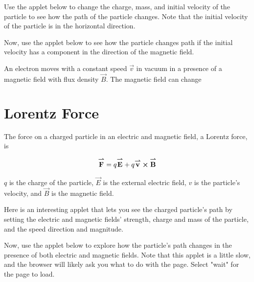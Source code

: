 \documentclass{ximera}
\begin{document}
\begin{example}

 Use the applet below to change the charge, mass, and initial velocity of the particle to see how the path of the particle changes. Note that the initial velocity of the particle is in the horizontal direction.


\end{example}


\begin{example}
Now, use the applet below to see how the particle changes path if the initial velocity has a component in the direction of the magnetic field.

\end{example}


\begin{question}

An electron moves with a constant speed $\vec{v}$ in vacuum in a presence of a magnetic field with flux density $\vec{B}$. The magnetic field can change
\begin{multipleChoice}  
\end{multipleChoice} 

\end{question}




\section{Lorentz Force}

The force on a charged particle in an electric and magnetic field, a Lorentz force, is  

\begin{equation}
{\overset{\boldsymbol{\rightharpoonup}}{\mathbf{F}}}\hspace{0in}=q{\overset{\boldsymbol{\rightharpoonup}}{\mathbf{E}}}\hspace{0in} + q {\overset{\boldsymbol{\rightharpoonup}}{\mathbf{v}}}\hspace{0in} \boldsymbol\times {\overset{\boldsymbol{\rightharpoonup}}{\mathbf{B}}}\hspace{0in}
\end{equation}

$q$ is the charge of the particle, $\vec{E}$ is the external electric field, $v$ is the particle's velocity, and $\vec{B}$ is the magnetic field.


Here is an interesting applet that lets you see the charged particle's path by setting the electric and magnetic fields' strength, charge and mass of the particle, and the speed direction and magnitude.




\begin{example}
Now, use the applet below to explore how the particle's path changes in the presence of both electric and magnetic fields. Note that this applet is a little slow, and the browser will likely ask you what to do with the page. Select "wait" for the page to load.

\end{example}
\end{document}
